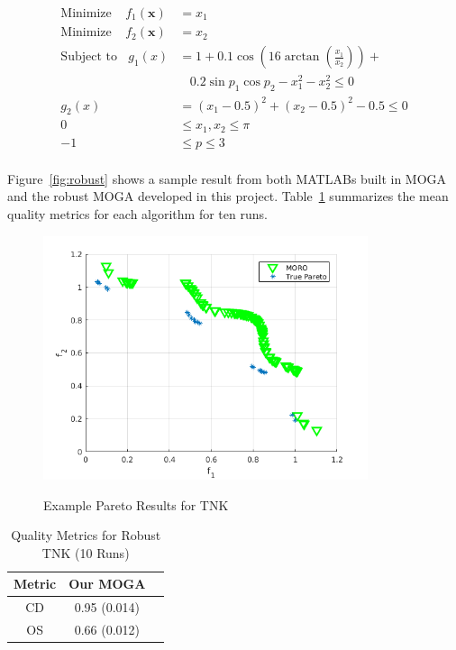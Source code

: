 \documentclass{article}
\begin{document}
\begin{align*}
\textrm{Minimize} ~~~~~ f_1(\textbf{x}) &= x_1 \\
\textrm{Minimize} ~~~~~ f_2(\textbf{x}) &= x_2 \\
\textrm{Subject to} ~~~~ g_1(x) &= 1+0.1\cos(16\arctan(\frac{x_1}{x_2})) + \\
&~~~~ 0.2\sin{p_1}\cos{p_2} -x_1^2-x_2^2\leq 0 \\
g_2(x) &= (x_1 - 0.5)^2 + (x_2 - 0.5)^2 -0.5 \leq 0 \\
0 &\leq  x_1,x_2 \leq \pi \\
-1& \leq p \leq 3\\
\end{align*}

\noindent Figure~\ref{fig:robust} shows a sample result from both MATLABs built in MOGA and the robust MOGA developed in this project. Table~\ref{tab:robustTNK} summarizes the mean quality metrics for each algorithm for ten runs.
\begin{figure}[H]
  \caption{Example Pareto Results for TNK}
  \centering
  \includegraphics[width=0.85\textwidth]{prob7_nChr25_nRun400.png}  
  \label{fig:robustTNK}
\end{figure}

\begin{table}[H]
\caption{Quality Metrics for Robust TNK (10 Runs)} 
\centering 
\begin{tabular}{|c|c|c|} 
\hline\hline  
Metric &  Our MOGA \\ \hline
CD & 0.95 (0.014) \\ \hline
OS & 0.66 (0.012) \\ \hline
\end{tabular}
\label{tab:robustTNK} 
\end{table}
 
\end{document}
